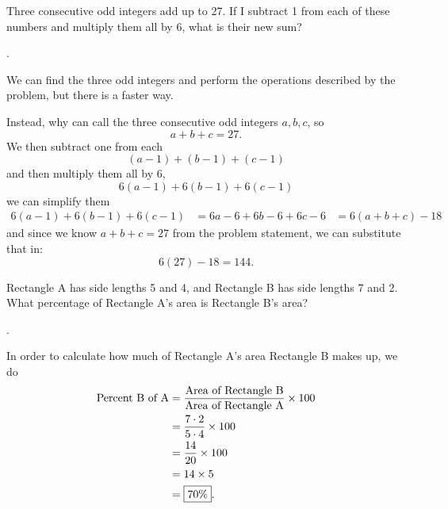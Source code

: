 \documentclass[11pt]{article}
\DeclareRobustCommand{\frac}[3][0pt]{%
  {\begingroup\hspace{#1}#2\hspace{#1}\endgroup\over\hspace{#1}#3\hspace{#1}}}
\begin{document}
\begin{problem}Three consecutive odd integers add up to 27. If I subtract 1 from each of these numbers and multiply them all by 6, what is their new sum?
\end{problem}
\begin{answer}
.
\end{answer}
\begin{solution}
We can find the three odd integers and perform the operations described by the problem, but there is a faster way. \par
Instead, why can call the three consecutive odd integers $a, b, c$, so
$$a+b+c=27.$$
We then subtract one from each
$$(a-1)+(b-1)+(c-1)$$
and then multiply them all by 6,
$$6(a-1)+6(b-1)+6(c-1)$$
we can simplify them
\begin{align*}
6(a-1)+6(b-1)+6(c-1) &= 6a-6+6b-6+6c-6
&= 6(a+b+c) - 18
\end{align*}
and since we know $a+b+c=27$ from the problem statement, we can substitute that in:
$$6(27)-18 = \boxed{144}.$$
\end{solution}

\begin{problem}Rectangle A has side lengths 5 and 4, and Rectangle B has side lengths 7 and 2. What percentage of Rectangle A's area is  Rectangle B's area?
\end{problem}
\begin{answer}
.
\end{answer}
\begin{solution}
In order to calculate how much of Rectangle A's area Rectangle B makes up, we do
\begin{align*}
\text{Percent B of A} &= \frac{\text{Area of Rectangle B}}{\text{Area of Rectangle A}} \times 100 \\
&= \frac{7 \cdot 2}{5 \cdot 4} \times 100 \\
&= \frac{14}{20} \times 100 \\
&= 14 \times 5 \\
&= \boxed{70 \%}.
\end{align*}
\end{solution}
\end{document}
